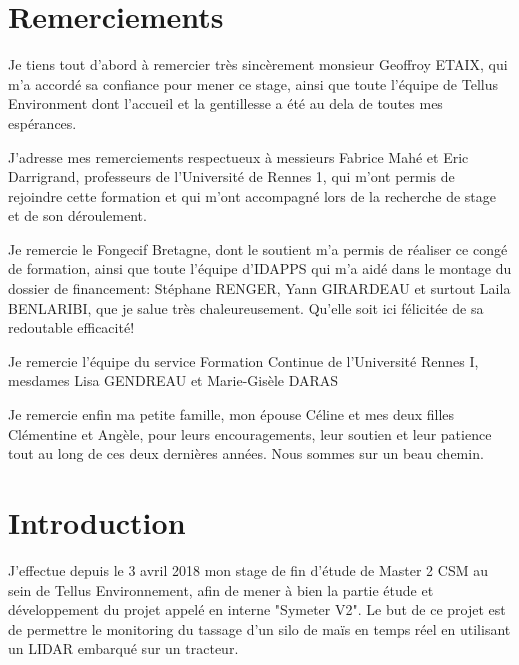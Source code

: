 \documentclass[12pt,a4paper]{report}
\begin{document}
\chapter*{Remerciements}%
\thispagestyle{empty}%

\para Je tiens tout d'abord à remercier très sincèrement monsieur Geoffroy ETAIX, qui m'a accordé sa confiance pour mener ce stage, ainsi que toute l'équipe de Tellus Environment dont l'accueil et la gentillesse a été au dela de toutes mes espérances.

\para J'adresse mes remerciements respectueux à messieurs Fabrice Mahé et Eric Darrigrand, professeurs de l'Université de Rennes 1, qui m'ont permis de rejoindre cette formation et qui m'ont accompagné lors de la recherche de stage et de son  déroulement.

\para Je remercie le Fongecif Bretagne, dont le soutient m'a permis de réaliser ce congé de formation, ainsi que toute l'équipe d'IDAPPS qui m'a aidé dans le montage du dossier de financement: Stéphane RENGER, Yann GIRARDEAU et surtout Laila BENLARIBI, que je salue très chaleureusement. Qu'elle soit ici félicitée de sa redoutable efficacité! 

\para Je remercie l'équipe du service Formation Continue de l'Université Rennes I, mesdames Lisa GENDREAU et Marie-Gisèle DARAS

\para Je remercie enfin ma petite famille, mon épouse Céline et mes deux filles Clémentine et Angèle, pour leurs encouragements, leur soutien et leur patience tout au long de ces deux dernières années. Nous sommes sur un beau chemin.


\setcounter{tocdepth}{5}
\tableofcontents

\printglossaries

\chapter{Introduction}

J'effectue depuis le 3 avril 2018 mon stage de fin d'étude de Master 2 CSM au sein de Tellus Environnement, afin de mener à bien la partie étude et développement du projet appelé en interne "Symeter V2". Le but de ce projet est de permettre le monitoring du tassage d'un silo de maïs en temps réel en utilisant un LIDAR embarqué sur un tracteur.
\end{document}
